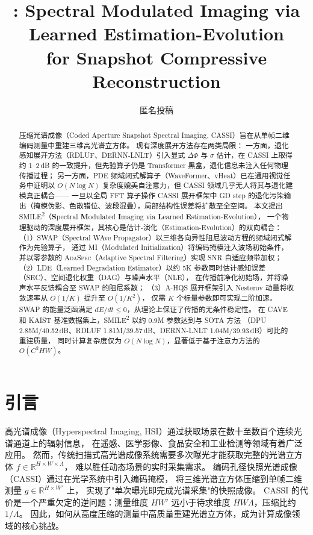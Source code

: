 \documentclass[a4paper,11pt,twocolumn]{ctexart}
\title{\smiletwo: Spectral Modulated Imaging via\\Learned Estimation-Evolution\\for Snapshot Compressive Reconstruction}
\author{匿名投稿}
\date{}
\newcommand{\smiletwo}{SMILE\textsuperscript{2}}
\newcommand{\swap}{\textsc{SWAP}}
\newcommand{\lde}{\textsc{LDE}}
\newcommand{\ahqs}{\textsc{A-HQS}}
\newcommand{\mi}{\textsc{MI}}
\newcommand{\adaspec}{\textsc{AdaSpec}}
\newcommand{\secm}{\textsc{SEC}}
\newcommand{\dag}{\textsc{DAG}}
\newcommand{\nle}{\textsc{NLE}}
\begin{document}
\maketitle

\begin{abstract}
压缩光谱成像（Coded Aperture Snapshot Spectral Imaging, CASSI）旨在从单帧二维编码测量中重建三维高光谱立方体。
现有深度展开方法存在两类局限：
一方面，退化感知展开方法（RDLUF、DERNN-LNLT）引入显式 $\Delta\Phi$ 与 $\sigma$ 估计，在 CASSI 上取得约 1--2\,dB 的一致提升，但先验算子仍是 Transformer 黑盒，退化信息未注入任何物理传播过程；
另一方面，PDE 频域闭式解算子（WaveFormer、vHeat）已在通用视觉任务中证明以 $O(N\log N)$ 复杂度媲美自注意力，但 CASSI 领域几乎无人将其与退化建模真正耦合——
一旦以全局 FFT 算子操作 CASSI 展开框架中 GD step 的退化污染输出（掩模伪影、色散错位、波段混叠），局部结构性误差将扩散至全空间。
本文提出 \smiletwo{}（\textbf{S}pectral \textbf{M}odulated \textbf{I}maging via \textbf{L}earned \textbf{E}stimation-\textbf{E}volution），
一个物理驱动的深度展开框架，其核心是估计-演化（Estimation-Evolution）的双向耦合：
（1）\swap{}（Spectral WAve Propagator）以三维各向异性阻尼波动方程的频域闭式解作为先验算子，
通过 \mi{}（Modulated Initialization）将编码掩模注入波场初始条件，并以零参数的 \adaspec{}（Adaptive Spectral Filtering）实现 SNR 自适应频带加权；
（2）\lde{}（Learned Degradation Estimator）以约 5K 参数同时估计感知误差（\secm）、空间退化权重（\dag）与噪声水平（\nle），
在传播前净化初始场，并将噪声水平反馈耦合至 \swap{} 的阻尼系数；
（3）\ahqs{} 展开框架引入 Nesterov 动量将收敛速率从 $O(1/K)$ 提升至 $O(1/K^2)$，
仅需 $K$ 个标量参数即可实现二阶加速。
\swap{} 的能量泛函满足 $dE/dt \le 0$，从理论上保证了传播的无条件稳定性。
在 CAVE 和 KAIST 基准数据集上，\smiletwo{} 以约 0.9M 参数达到与 SOTA 方法
（DPU 2.85M/40.52\,dB、RDLUF 1.81M/39.57\,dB、DERNN-LNLT 1.04M/39.93\,dB）可比的重建质量，
同时计算复杂度仅为 $O(N\log N)$，显著低于基于注意力方法的 $O(C^2HW)$。
\end{abstract}

\section{引言}\label{sec:intro}

高光谱成像（Hyperspectral Imaging, HSI）通过获取场景在数十至数百个连续光谱通道上的辐射信息，
在遥感、医学影像、食品安全和工业检测等领域有着广泛应用。
然而，传统扫描式高光谱成像系统需要多次曝光才能获取完整的光谱立方体 $f \in \mathbb{R}^{H \times W \times \Lambda}$，
难以胜任动态场景的实时采集需求。
编码孔径快照光谱成像（CASSI）\citep{wagadarikar2008cassi,gehm2007ddcassi}通过在光学系统中引入编码掩模，
将三维光谱立方体压缩到单帧二维测量 $g \in \mathbb{R}^{H \times W'}$ 上，
实现了"单次曝光即完成光谱采集"的快照成像。
CASSI 的代价是一个严重欠定的逆问题：测量维度 $HW'$ 远小于待求维度 $HW\Lambda$，压缩比约 $1/\Lambda$。
因此，如何从高度压缩的测量中高质量重建光谱立方体，成为计算成像领域的核心挑战。
\end{document}
